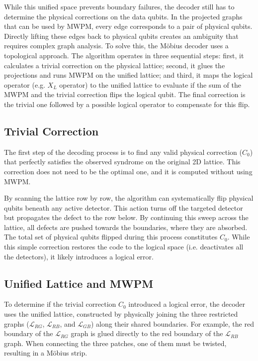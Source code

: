 While this unified space prevents boundary failures, the decoder still has to determine the physical corrections on the data qubits. In the projected graphs that can be used by MWPM, every edge corresponds to a pair of physical qubits. Directly lifting these edges back to physical qubits creates an ambiguity that requires complex graph analysis. To solve this, the Möbius decoder uses a topological approach. The algorithm operates in three sequential steps: first, it calculates a trivial correction on the physical lattice; second, it glues the projections and runs MWPM on the unified lattice; and third, it maps the logical operator (e.g. $X_L$ operator) to the unified lattice to evaluate if the sum of the MWPM and the trivial correction flips the logical qubit. The final correction is the trivial one followed by a possible logical operator to compensate for this flip.

\subsection{Trivial Correction}
 The first step of the decoding process is to find any valid physical correction ($C_0$) that perfectly satisfies the observed syndrome on the original 2D lattice. This correction does not need to be the optimal one, and it is computed without using MWPM. 

By scanning the lattice row by row, the algorithm can systematically flip physical qubits beneath any active detector. This action turns off the targeted detector but propagates the defect to the row below. By continuing this sweep across the lattice, all defects are pushed towards the boundaries, where they are absorbed. The total set of physical qubits flipped during this process constitutes $C_0$. While this simple correction restores the code to the logical space (i.e. deactivates all the detectors), it likely introduces a logical error.

\subsection{Unified Lattice and MWPM}
To determine if the trivial correction $C_0$ introduced a logical error, the decoder uses the unified lattice, constructed by physically joining the three restricted graphs ($\mathcal{L}_{RG}$, $\mathcal{L}_{RB}$, and $\mathcal{L}_{GB}$) along their shared boundaries. For example, the red boundary of the $\mathcal{L}_{RG}$ graph is glued directly to the red boundary of the $\mathcal{L}_{RB}$ graph. When connecting the three patches, one of them must be twisted, resulting in a Möbius strip.


